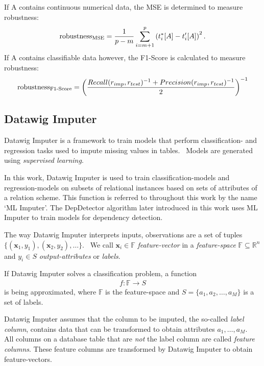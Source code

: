 If \textsc{A} contains continuous numerical data, the MSE is determined to measure robustness:
\begin{align}\label{eq:robustness-mse}
    \text{robustness\textsubscript{MSE}} = \frac{1}{p-m}\sum_{i=m+1}^{p} \left(t_{i}^{\ast}[A] - t_{i}^{\prime}[A]\right)^2.
\end{align}
If \textsc{A} contains classifiable data however, the F1-Score is calculated to measure robustness:
\begin{align}\label{eq:robustness-f1-score}
    \text{robustness\textsubscript{F1-Score}} = {\left(\frac{Recall(r_{imp}, r_{test})^{-1} + Precision(r_{imp}, r_{test})^{-1}}{2}\right)}^{-1}
\end{align}


\subsection{Datawig Imputer}
Datawig Imputer is a framework to train models that perform classification- and regression tasks used to impute missing values in tables.~\cite[p.~1]{BIE18}
Models are generated using \emph{supervised learning}.

In this work, Datawig Imputer is used to train classification-models and regression-models on subsets of relational instances based on sets of attributes of a relation scheme.
This function is referred to throughout this work by the name `ML Imputer'.
The DepDetector algorithm later introduced in this work uses ML Imputer to train models for dependency detection.

The way Datawig Imputer interprets inputs, observations are a set of tuples \( \{\left(\mathbold{x}_1, y_1\right),\left(\mathbold{x}_2, y_2\right), \dots \} \).~\cite[p.~10]{SMO08}
We call \( \mathbold{x}_i \in \mathbb{F}\) \emph{feature-vector} in a \emph{feature-space} \( \mathbb{F} \subseteq \mathbb{R}^{n} \) and \( y_i \in S \) \emph{output-attributes} or \emph{labels}.~\cite[p.~7]{DUD00}

If Datawig Imputer solves a classification problem, a function
\begin{align*}
    f: \mathbb{F} \rightarrow S
\end{align*}
is being approximated, where \( \mathbb{F} \) is the feature-space and \( S = \{a_1, a_2, \dots, a_M \} \) is a set of labels.

Datawig Imputer assumes that the column to be imputed, the so-called \emph{label column}, contains data that can be transformed to obtain attributes \( a_1, \dots, a_M \).~\cite[p.~2018]{BIE18}
All columns on a database table that are \emph{not} the label column are called \emph{feature columns}.
These feature columns are transformed by Datawig Imputer to obtain feature-vectors.

